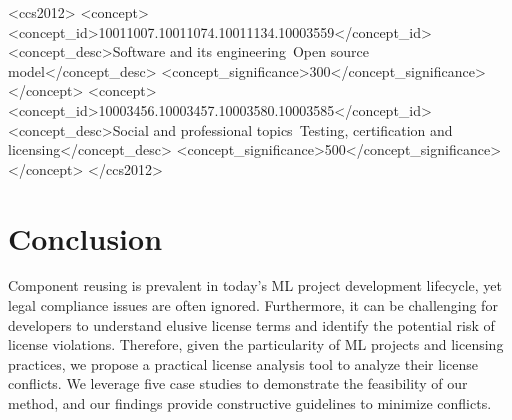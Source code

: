 \documentclass[sigconf]{acmart}
\begin{document}

\begin{CCSXML}
  <ccs2012>
     <concept>
         <concept_id>10011007.10011074.10011134.10003559</concept_id>
         <concept_desc>Software and its engineering~Open source model</concept_desc>
         <concept_significance>300</concept_significance>
         </concept>
     <concept>
         <concept_id>10003456.10003457.10003580.10003585</concept_id>
         <concept_desc>Social and professional topics~Testing, certification and licensing</concept_desc>
         <concept_significance>500</concept_significance>
         </concept>
   </ccs2012>
\end{CCSXML}




\maketitle









\section{Conclusion}
\label{sec:conclusion}
Component reusing is prevalent in today's ML project development lifecycle, yet legal compliance issues are often ignored. Furthermore, it can be challenging for developers to understand elusive license terms and identify the potential risk of license violations.
Therefore, given the particularity of ML projects and licensing practices, we propose a practical license analysis tool to analyze their license conflicts.
We leverage five case studies to demonstrate the feasibility of our method, and our findings provide constructive guidelines to minimize conflicts.
\end{document}
